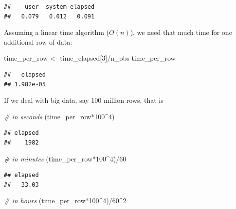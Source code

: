 \documentclass[
  12pt,
]{style/krantz}
\newenvironment{Shaded}{\begin{snugshade}}{\end{snugshade}}
\newcommand{\CommentTok}[1]{\textcolor[rgb]{0.56,0.35,0.01}{\textit{#1}}}
\newcommand{\DecValTok}[1]{\textcolor[rgb]{0.00,0.00,0.81}{#1}}
\newcommand{\NormalTok}[1]{#1}
\newcommand{\OtherTok}[1]{\textcolor[rgb]{0.56,0.35,0.01}{#1}}
\newcommand{\SpecialCharTok}[1]{\textcolor[rgb]{0.00,0.00,0.00}{#1}}
\begin{document}
\begin{verbatim}
##    user  system elapsed 
##   0.079   0.012   0.091
\end{verbatim}

Assuming a linear time algorithm (\(O(n)\)), we need that much time for one additional row of data:

\begin{Shaded}
\begin{Highlighting}[]
\NormalTok{time\_per\_row }\OtherTok{\textless{}{-}}\NormalTok{ time\_elapsed[}\DecValTok{3}\NormalTok{]}\SpecialCharTok{/}\NormalTok{n\_obs}
\NormalTok{time\_per\_row}
\end{Highlighting}
\end{Shaded}

\begin{verbatim}
##   elapsed 
## 1.982e-05
\end{verbatim}

If we deal with big data, say 100 million rows, that is

\begin{Shaded}
\begin{Highlighting}[]
\CommentTok{\# in seconds}
\NormalTok{(time\_per\_row}\SpecialCharTok{*}\DecValTok{100}\SpecialCharTok{\^{}}\DecValTok{4}\NormalTok{) }
\end{Highlighting}
\end{Shaded}

\begin{verbatim}
## elapsed 
##    1982
\end{verbatim}

\begin{Shaded}
\begin{Highlighting}[]
\CommentTok{\# in minutes}
\NormalTok{(time\_per\_row}\SpecialCharTok{*}\DecValTok{100}\SpecialCharTok{\^{}}\DecValTok{4}\NormalTok{)}\SpecialCharTok{/}\DecValTok{60} 
\end{Highlighting}
\end{Shaded}

\begin{verbatim}
## elapsed 
##   33.03
\end{verbatim}

\begin{Shaded}
\begin{Highlighting}[]
\CommentTok{\# in hours}
\NormalTok{(time\_per\_row}\SpecialCharTok{*}\DecValTok{100}\SpecialCharTok{\^{}}\DecValTok{4}\NormalTok{)}\SpecialCharTok{/}\DecValTok{60}\SpecialCharTok{\^{}}\DecValTok{2} 
\end{Highlighting}
\end{Shaded}
\end{document}
